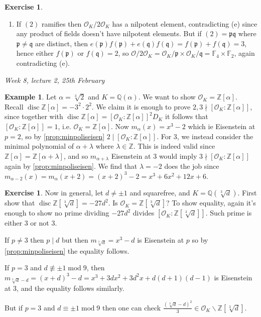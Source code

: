 \documentclass{article}
\newcommand{\Z}{\mathbb{Z}}
\newcommand{\Q}{\mathbb{Q}}
\newcommand{\F}{\mathbb{F}}
\newcommand{\Mod}{\operatorname{mod}}
\newcommand{\disc}{\operatorname{disc}}
\newcommand{\ri}{\mathcal{O}}
\newcommand{\ip}{\mathfrak{p}}
\newcommand{\iq}{\mathfrak{q}}
\theoremstyle{definition}
\newtheorem{example}[defn]{Example}
\newtheorem{exe}[defn]{Exercise}
\begin{document}
\begin{exe}
\begin{enumerate}
\begin{enumerate}
\item If $(2)$ ramifies then $\ri_K/2\ri_K$ has a nilpotent element, contradicting (e) since any product of fields doesn't have nilpotent elements. But if $(2)=\ip\iq$ where $\ip\neq\iq$ are distinct, then $e(\ip)f(\ip)+e(\iq)f(\iq)=f(\ip)+f(\iq)=3$, hence either $f(\ip)$ or $f(\iq)=2$, so $\ri/2\ri_K=\ri_K/\ip\times\ri_K/\iq=\F_4\times\F_2$, again contradicting (e).
\end{enumerate}
\end{enumerate}
\end{exe}

\begin{flushright}
\textit{Week 8, lecture 2, 25th February}
\end{flushright}

\begin{example}
Let $\alpha=\sqrt[3]2$ and $K=\Q(\alpha)$. We want to show $\ri_K=\Z[\alpha]$. Recall $\disc \Z[\alpha]=-3^2\cdot 2^2$. We claim it is enough to prove $2,3\nmid [\ri_K:\Z[\alpha]]$, since together with $\disc\Z[\alpha]=[\ri_K:\Z[\alpha]]^2 D_K$ it follows that $[\ri_K:\Z[\alpha]]=1$, i.e. $\ri_K=\Z[\alpha]$.  Now $m_\alpha(x)=x^3-2$ which ie Eisenstein at $p=2$, so by \ref{prop:minpoliseisen} $2\mid [\ri_K:\Z[\alpha]]$. For 3, we instead consider the minimal polynomial of $\alpha+\lambda$ where $\lambda\in\Z$. This is indeed valid since $\Z[\alpha]=\Z[\alpha+\lambda]$, and so $m_{\alpha+\lambda}$ Eisenstein at 3 would imply $3\nmid [\ri_K:\Z[\alpha]]$ again by \ref{prop:minpoliseisen}. We find that $\lambda=-2$ does the job since $m_{\alpha-2}(x)=m_\alpha(x+2)=(x+2)^3-2=x^3+6x^2+12x+6$.
\end{example}

\begin{exe}
Now in general, let $d\neq\pm 1$ and squarefree, and $K=\Q\left(\sqrt[3]d\right)$. First show that $\disc \Z\left[\sqrt[3]d\right]=-27d^2$. Is $\ri_K=\Z\left[\sqrt[3]d\right]$? To show equality, again it's enough to show no prime dividing $-27d^2$ divides $\left[\ri_K:\Z\left[\sqrt[3]d\right]\right]$. Such prime is either 3 or not 3.

If $p\neq 3$ then $p\mid d$ but then $m_{\sqrt[3]d}=x^3-d$ is Eisenstein at $p$ so by \ref{prop:minpoliseisen} the equality follows.

If $p=3$ and $d\not\equiv\pm 1\Mod 9$, then $m_{\sqrt[3]d-d}=(x+d)^3-d=x^3+3dx^2+3d^2x+d(d+1)(d-1)$ is Eisenstein at 3, and the equality follows similarly.

But if $p=3$ and $d\equiv\pm 1\Mod 9$ then one can check $\frac{\left(\sqrt[3]d-d\right)^2}{3}\in\ri_K\backslash\Z\left[\sqrt[3]d\right]$.
\end{exe}
\end{document}
